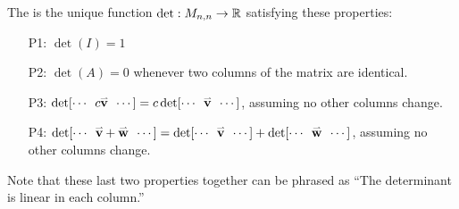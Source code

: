 \begin{definition}
The  is the unique function
\(\det:M_{n,n}\to\IR\) satisfying these  properties:
\begin{enumerate}
\item [P1:] $\det(I)=1$
\item [P2:] $\det(A)=0$ whenever two columns of the matrix are identical.
\item[P3:]
\(\det[\cdots\hspace{0.5em}c\vec{v}\hspace{0.5em}\cdots]=
c\det[\cdots\hspace{0.5em}\vec{v}\hspace{0.5em}\cdots]\), assuming no other columns change.
\item[P4:]
\(\det[\cdots\hspace{0.5em}\vec{v}+\vec{w}\hspace{0.5em}\cdots]=
\det[\cdots\hspace{0.5em}\vec{v}\hspace{0.5em}\cdots]+
\det[\cdots\hspace{0.5em}\vec{w}\hspace{0.5em}\cdots]\), assuming no other columns change.
\end{enumerate}

\vspace{1em}

Note that these last two properties together can be phrased as ``The determinant is linear in each column.''

\end{definition}



